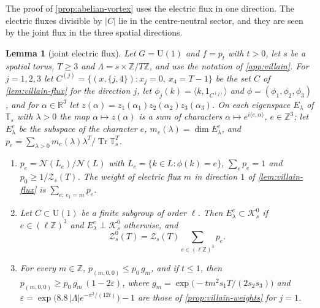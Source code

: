 \documentclass[11pt,a4paper]{amsart}
\newtheorem{lemma}[theorem]{Lemma}
\theoremstyle{definition}
\theoremstyle{remark}
\numberwithin{equation}{section}
\DeclareMathOperator{\Tr}{Tr}        %
\newcommand{\R}{\mathbb{R}}          %
\newcommand{\Z}{\mathbb{Z}}          %
\newcommand{\Kspace}{\mathcal{K}}    %
\newcommand{\ip}[2]{\langle #1,#2\rangle}  %
\newcommand{\abs}[1]{\lvert #1\rvert}      %
\newcommand{\U}{\mathrm{U}}                %
\newcommand{\TT}{\mathbb{T}}               %
\newcommand{\Zc}{\mathcal{Z}}              %
\newcommand{\Zs}[2]{\Zc_{#1}(#2)}          %
\begin{document}
The proof of \cref{prop:abelian-vortex} uses the electric flux in one direction. The electric fluxes divisible by $\abs C$ lie in the centre-neutral sector, and they are seen by the joint flux in the three spatial directions.

\begin{lemma}[joint electric flux]\label{lem:u1-joint-flux}
Let $G=\U(1)$ and $f=p_t$ with $t>0$, let $s$ be a spatial torus, $T\ge3$ and $\Lambda=s\times\Z/T\Z$, and use the notation of \cref{app:villain}. For $j=1,2,3$ let $C^{(j)}=\{(x,\{j,4\}):x_j=0,\ x_4=T-1\}$ be the set $C$ of \cref{lem:villain-flux} for the direction $j$, let $\phi_j(k)=\ip k{1_{C^{(j)}}}$ and $\phi=(\phi_1,\phi_2,\phi_3)$, and for $\alpha\in\R^3$ let $z(\alpha)=z_1(\alpha_1)z_2(\alpha_2)z_3(\alpha_3)$. On each eigenspace $E_\lambda$ of $\TT_s$ with $\lambda>0$ the map $\alpha\mapsto z(\alpha)$ is a sum of characters $\alpha\mapsto e^{i\ip e\alpha}$, $e\in\Z^3$; let $E^e_\lambda$ be the subspace of the character $e$, $m_e(\lambda)=\dim E^e_\lambda$, and $p_e=\sum_{\lambda>0}m_e(\lambda)\lambda^T/\Tr\TT_s^T$.
\begin{enumerate}[label=\textup{(\alph*)},leftmargin=*]
\item $p_e=\mathcal N(L_e)/\mathcal N(L)$ with $L_e=\{k\in L:\phi(k)=e\}$, $\sum_ep_e=1$ and $p_0\ge1/\Zs sT$. The weight of electric flux $m$ in direction $1$ of \cref{lem:villain-flux} is $\sum_{e:\,e_1=m}p_e$.
\item Let $C\subset\U(1)$ be a finite subgroup of order $\ell$. Then $E^e_\lambda\subset\Kspace^0_s$ if $e\in(\ell\Z)^3$ and $E^e_\lambda\perp\Kspace^0_s$ otherwise, and
\[
\Zc^0_s(T)=\Zs sT\sum_{e\in(\ell\Z)^3}p_e .
\]
\item For every $m\in\Z$, $p_{(m,0,0)}\le p_0\,g_m$, and if $t\le1$, then $p_{(m,0,0)}\ge p_0\,g_m\,(1-2\varepsilon)$, where $g_m=\exp\bigl(-tm^2s_1T/(2s_2s_3)\bigr)$ and $\varepsilon=\exp\bigl(8.8\,\abs\Lambda e^{-\pi^2/(12t)}\bigr)-1$ are those of \cref{prop:villain-weights} for $j=1$.
\end{enumerate}
\end{lemma}
\end{document}
